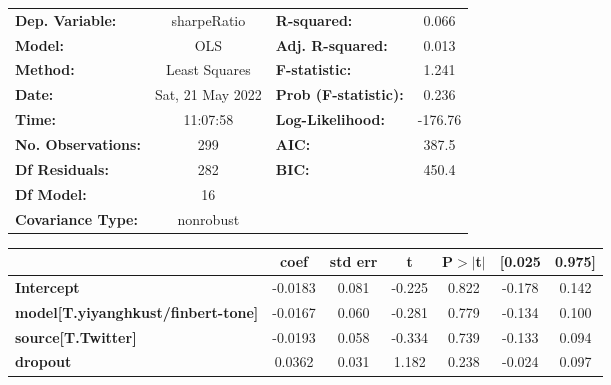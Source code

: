 \begin{center}
\begin{tabular}{lclc}
\toprule
\textbf{Dep. Variable:}                    &   sharpeRatio    & \textbf{  R-squared:         } &     0.066   \\
\textbf{Model:}                            &       OLS        & \textbf{  Adj. R-squared:    } &     0.013   \\
\textbf{Method:}                           &  Least Squares   & \textbf{  F-statistic:       } &     1.241   \\
\textbf{Date:}                             & Sat, 21 May 2022 & \textbf{  Prob (F-statistic):} &    0.236    \\
\textbf{Time:}                             &     11:07:58     & \textbf{  Log-Likelihood:    } &   -176.76   \\
\textbf{No. Observations:}                 &         299      & \textbf{  AIC:               } &     387.5   \\
\textbf{Df Residuals:}                     &         282      & \textbf{  BIC:               } &     450.4   \\
\textbf{Df Model:}                         &          16      & \textbf{                     } &             \\
\textbf{Covariance Type:}                  &    nonrobust     & \textbf{                     } &             \\
\bottomrule
\end{tabular}
\begin{tabular}{lcccccc}
                                           & \textbf{coef} & \textbf{std err} & \textbf{t} & \textbf{P$> |$t$|$} & \textbf{[0.025} & \textbf{0.975]}  \\
\midrule
\textbf{Intercept}                         &      -0.0183  &        0.081     &    -0.225  &         0.822        &       -0.178    &        0.142     \\
\textbf{model[T.yiyanghkust/finbert-tone]} &      -0.0167  &        0.060     &    -0.281  &         0.779        &       -0.134    &        0.100     \\
\textbf{source[T.Twitter]}                 &      -0.0193  &        0.058     &    -0.334  &         0.739        &       -0.133    &        0.094     \\
\textbf{dropout}                           &       0.0362  &        0.031     &     1.182  &         0.238        &       -0.024    &        0.097     \\

\end{tabular}
\end{center}

